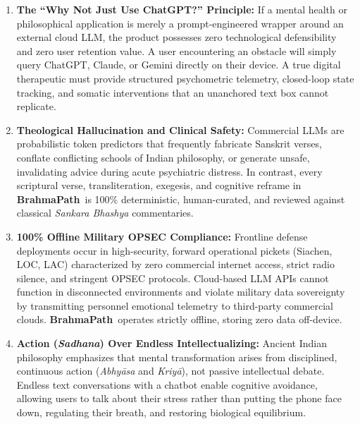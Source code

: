 \documentclass[11pt,a4paper]{article}
\newcommand{\AppName}{\textbf{BrahmaPath}}
\begin{document}
\begin{enumerate}[leftmargin=*]
    \item \textbf{The ``Why Not Just Use ChatGPT?'' Principle:} If a mental health or philosophical application is merely a prompt-engineered wrapper around an external cloud LLM, the product possesses zero technological defensibility and zero user retention value. A user encountering an obstacle will simply query ChatGPT, Claude, or Gemini directly on their device. A true digital therapeutic must provide structured psychometric telemetry, closed-loop state tracking, and somatic interventions that an unanchored text box cannot replicate.
    \item \textbf{Theological Hallucination and Clinical Safety:} Commercial LLMs are probabilistic token predictors that frequently fabricate Sanskrit verses, conflate conflicting schools of Indian philosophy, or generate unsafe, invalidating advice during acute psychiatric distress. In contrast, every scriptural verse, transliteration, exegesis, and cognitive reframe in \AppName\ is 100\% deterministic, human-curated, and reviewed against classical \textit{Sankara Bhashya} commentaries.
    \item \textbf{100\% Offline Military OPSEC Compliance:} Frontline defense deployments occur in high-security, forward operational pickets (Siachen, LOC, LAC) characterized by zero commercial internet access, strict radio silence, and stringent OPSEC protocols. Cloud-based LLM APIs cannot function in disconnected environments and violate military data sovereignty by transmitting personnel emotional telemetry to third-party commercial clouds. \AppName\ operates strictly offline, storing zero data off-device.
    \item \textbf{Action (\textit{Sadhana}) Over Endless Intellectualizing:} Ancient Indian philosophy emphasizes that mental transformation arises from disciplined, continuous action (\textit{Abhy\=asa} and \textit{Kriy\=a}), not passive intellectual debate. Endless text conversations with a chatbot enable cognitive avoidance, allowing users to talk about their stress rather than putting the phone face down, regulating their breath, and restoring biological equilibrium.
\end{enumerate}
\end{document}
